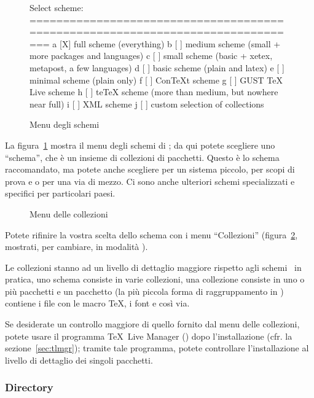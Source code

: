 \documentclass{article}
\begin{document}
\begin{figure}[tbh]
\begin{boxedverbatim}
Select scheme:
===============================================================================
 a [X] full scheme (everything)
 b [ ] medium scheme (small + more packages and languages)
 c [ ] small scheme (basic + xetex, metapost, a few languages)
 d [ ] basic scheme (plain and latex)
 e [ ] minimal scheme (plain only)
 f [ ] ConTeXt scheme
 g [ ] GUST TeX Live scheme
 h [ ] teTeX scheme (more than medium, but nowhere near full)
 i [ ] XML scheme
 j [ ] custom selection of collections
\end{boxedverbatim}
\caption{Menu degli schemi}\label{fig:scheme-text}
\end{figure}

La figura~\ref{fig:scheme-text} mostra il menu degli schemi di \TL; da qui
potete scegliere uno ``schema'', che è un insieme di collezioni di pacchetti.
Questo è lo schema raccomandato, ma potete anche scegliere 
per un sistema piccolo,  per scopi di prova e
 o  per una via di mezzo. Ci sono anche
ulteriori schemi specializzati e specifici per particolari paesi.

\begin{figure}[tbh]
\centering {}
\caption{Menu delle collezioni}\label{fig:collections-gui}
\end{figure}

Potete rifinire la vostra scelta dello schema con i menu ``Collezioni''
(figura~\ref{fig:collections-gui}, mostrati, per cambiare, in modalità \GUI).

Le collezioni stanno ad un livello di dettaglio maggiore rispetto agli
schemi \Dash\ in pratica, uno schema consiste in varie collezioni, una
collezione consiste in uno o più pacchetti e un pacchetto (la più piccola
forma di raggruppamento in \TL) contiene i file con le macro \TeX, i font
e così via.

Se desiderate un controllo maggiore di quello fornito dal menu delle
collezioni, potete usare il programma \TeX\ Live Manager ()
dopo l'installazione (cfr. la sezione~\ref{sec:tlmgr}); tramite tale
programma, potete controllare l'installazione al livello di dettaglio dei
singoli pacchetti.

\subsubsection{Directory}
\label{sec:directories}
\end{document}
